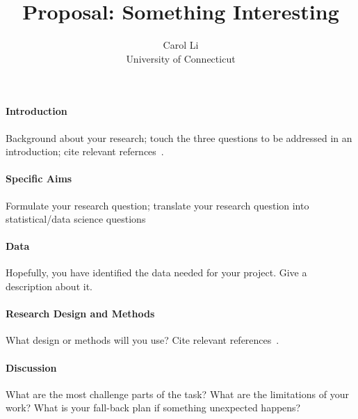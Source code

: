 \documentclass[12pt]{article}
\title{Proposal: Something Interesting}
\author{Carol Li\\
  University of Connecticut
}
\begin{document}
\maketitle


\paragraph{Introduction}
Background about your research; touch the three questions to be addressed in an
introduction; cite relevant refernces~\citep[e.g.,][]{}.

\lipsum[1]

\paragraph{Specific Aims}
Formulate your research question;
translate your research question into statistical/data science questions

\lipsum[2]

\paragraph{Data}
Hopefully, you have identified the data needed for your project. Give a
description about it.

\lipsum[3]

\paragraph{Research Design and Methods}
What design or methods will you use?
Cite relevant references~\citep[e.g.,][]{}.

\lipsum[4]

\paragraph{Discussion}
What are the most challenge parts of the task?
What are the limitations of your work? What is your fall-back plan if
something unexpected happens?

\lipsum[5]



\end{document}
